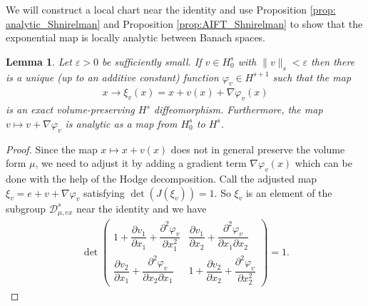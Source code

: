 \documentclass[11pt]{amsart}
\numberwithin{equation}{section}
\newtheorem{lemma}[theorem]{Lemma}
\begin{document}
We will construct a local chart near the identity and use Proposition \ref{prop: analytic_Shnirelman} and Proposition \ref{prop:AIFT_Shnirelman} to show that the exponential map is locally analytic between Banach spaces.
 \begin{lemma}
  Let $\varepsilon>0$ be sufficiently small. If $v\in H_0^{s}$ with $\|v\|_s<\varepsilon$ then there is a unique (up to an additive constant) function $\varphi_{v}\in H^{s+1}$ such that the map 
     \begin{align}
     	x\rightarrow \xi_v(x)=x+v(x)+\nabla \varphi_{v}(x)
     \end{align}
 is an exact volume-preserving $H^s$ diffeomorphism. Furthermore, the map $v\mapsto v+\nabla  \varphi_{v}$ is analytic  as a map from $H_0^s$ to $H^s$.
 \end{lemma}
\begin{proof}
Since  the map $x\mapsto x+v(x)$ does not in general preserve the volume form $\mu$, we need to adjust it by adding a gradient term $\nabla \varphi_{v}(x)$ which can be done with the help of the Hodge decomposition.
    Call the adjusted map $\xi_v=e+v+\nabla \varphi_{v}$ satisfying $\det (J (\xi_v))=1$. So $\xi_v$ is an element of the subgroup $\mathcal{D}_{\mu, ex}^s$ near the identity and we have
     \begin{align}\label{eqn:det_der_gamma_v}
         \det\begin{pmatrix}
             1+\dfrac{\partial v_1}{\partial x_1}+ \dfrac{\partial^2 \varphi_{v}}{\partial x_1^2} &  \dfrac{\partial v_1}{\partial x_2}+ \dfrac{\partial^2 \varphi_{v}}{\partial x_1 \partial x_2}\\
             \dfrac{\partial v_2}{\partial x_1}+ \dfrac{\partial^2 \varphi_{v}}{\partial x_2 \partial x_1} &  1+\dfrac{\partial v_2}{\partial x_2}+ \dfrac{\partial^2 \varphi_{v}}{\partial x_2^2}
         \end{pmatrix}=1.
     \end{align}


\end{proof}
\end{document}
